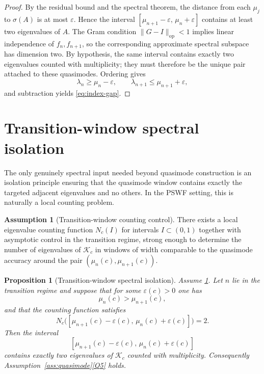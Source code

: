 \documentclass[12pt,a4paper]{amsart}
\newtheorem{proposition}[theorem]{Proposition}
\theoremstyle{definition}
\newtheorem{assumption}[theorem]{Assumption}
\theoremstyle{remark}
\newcommand{\norm}[1]{\|#1\|}
\newcommand{\Kc}{\mathcal{K}_c}
\newcommand{\op}{\mathrm{op}}
\begin{document}
\begin{proof}
By the residual bound and the spectral theorem, the distance from each
$\mu_j$ to $\sigma(A)$ is at most $\varepsilon$.
Hence the interval
$[\mu_{n+1}-\varepsilon,\,\mu_n+\varepsilon]$ contains at least two
eigenvalues of $A$.
The Gram condition $\norm{G-I}_{\op}<1$ implies linear independence of
$f_n,f_{n+1}$, so the corresponding approximate spectral subspace has
dimension two.
By hypothesis, the same interval contains exactly two eigenvalues counted
with multiplicity; they must therefore be the unique pair attached to these
quasimodes.
Ordering gives
\[
  \lambda_n \ge \mu_n-\varepsilon,
  \qquad
  \lambda_{n+1} \le \mu_{n+1}+\varepsilon,
\]
and subtraction yields \eqref{eq:index-gap}.
\end{proof}

\section{Transition-window spectral isolation}
\label{sec:isolation}

The only genuinely spectral input needed beyond quasimode construction is an
isolation principle ensuring that the quasimode window contains exactly the
targeted adjacent eigenvalues and no others.
In the PSWF setting, this is naturally a local counting problem.

\begin{assumption}[Transition-window counting control]
\label{ass:counting}
There exists a local eigenvalue counting function $N_c(I)$ for intervals
$I\subset(0,1)$ together with asymptotic control in the transition regime,
strong enough to determine the number of eigenvalues of $\Kc$ in windows of
width comparable to the quasimode accuracy around the pair
$(\mu_n(c),\mu_{n+1}(c))$.
\end{assumption}

\begin{proposition}[Transition-window spectral isolation]
\label{prop:isolation}
Assume \ref{ass:counting}.
Let $n$ lie in the transition regime and suppose that for some
$\varepsilon(c)>0$ one has
\[
  \mu_n(c) > \mu_{n+1}(c),
\]
and that the counting function satisfies
\begin{equation}\label{eq:isolation-count}
  N_c\bigl([\mu_{n+1}(c)-\varepsilon(c),\,\mu_n(c)+\varepsilon(c)]\bigr)=2.
\end{equation}
Then the interval
\[
  [\mu_{n+1}(c)-\varepsilon(c),\,\mu_n(c)+\varepsilon(c)]
\]
contains exactly two eigenvalues of $\Kc$ counted with multiplicity.
Consequently Assumption~\ref{ass:quasimode}\ref{Q5} holds.
\end{proposition}
\end{document}
